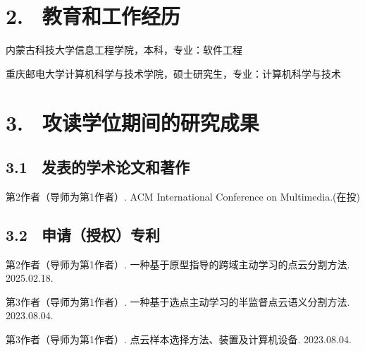 \section{2. \ 教育和工作经历}
\begin{description}[leftmargin=3.5cm, style=sameline]
\item[2017.09$\sim$2021.07] 内蒙古科技大学信息工程学院，本科，专业：软件工程
\item[2022.09$\sim$2025.06] 重庆邮电大学计算机科学与技术学院，硕士研究生，专业：计算机科学与技术
\end{description}


\section{3. \ 攻读学位期间的研究成果}

\subsection{3.1 \ 发表的学术论文和著作}
\noindent [1]
\begin{minipage}[t]{0.96\linewidth}
第2作者（导师为第1作者）. ACM International Conference on Multimedia.(在投)
\end{minipage}
\vspace{0cm}

\subsection{3.2 \ 申请（授权）专利}
\noindent [1]
\begin{minipage}[t]{0.96\linewidth}
第2作者（导师为第1作者）. 一种基于原型指导的跨域主动学习的点云分割方法. 2025.02.18.
\end{minipage}
\noindent [1]
\begin{minipage}[t]{0.96\linewidth}
第3作者（导师为第1作者）. 一种基于选点主动学习的半监督点云语义分割方法. 2023.08.04.
\end{minipage}
\noindent [1]
\begin{minipage}[t]{0.96\linewidth}
第3作者（导师为第1作者）. 点云样本选择方法、装置及计算机设备. 2023.08.04.
\end{minipage}

